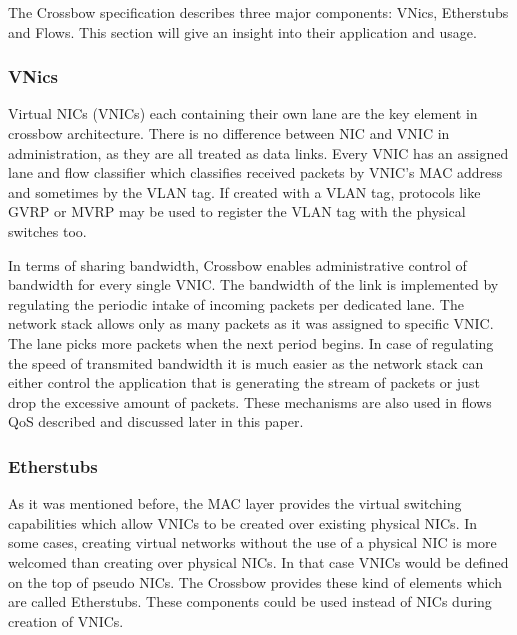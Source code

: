 \documentclass[11pt]{book}
\begin{document}
        The Crossbow specification describes three major components: VNics, Etherstubs and Flows. This section will give
        an insight into their application and usage.

                
        \subsubsection{VNics}
        
          Virtual NICs (VNICs) each containing their own lane are the key element in crossbow architecture. There is no
          difference between NIC and VNIC in administration, as they are all treated as data links. Every VNIC has an
          assigned lane and flow classifier which classifies received packets by VNIC's MAC address and sometimes by the
          VLAN tag.  If created with a VLAN tag, protocols like GVRP or MVRP may be used to register the VLAN tag with
          the physical switches too.	

          In terms of sharing bandwidth, Crossbow enables administrative control of bandwidth for every single VNIC. The
          bandwidth of the link is implemented by regulating the periodic intake of incoming packets per dedicated lane.
          The network stack allows only as many packets as it was assigned to specific VNIC. The lane picks more packets
          when the next period begins. In case of regulating the speed of transmited bandwidth it is much easier as the
          network stack can either control the application that is generating the stream of packets or just drop the
          excessive amount of packets.  These mechanisms are also used in flows QoS described and discussed later in
          this paper.


        \subsubsection{Etherstubs}

          As it was mentioned before, the MAC layer provides the virtual switching capabilities which allow VNICs to be
          created over existing physical NICs.  In some cases, creating virtual networks without the use of a physical
          NIC is more welcomed than creating over physical NICs. In that case VNICs would be defined on the top of
          pseudo NICs.  The Crossbow provides these kind of elements which are called Etherstubs. These components could
          be used instead of NICs during creation of VNICs.
\end{document}
